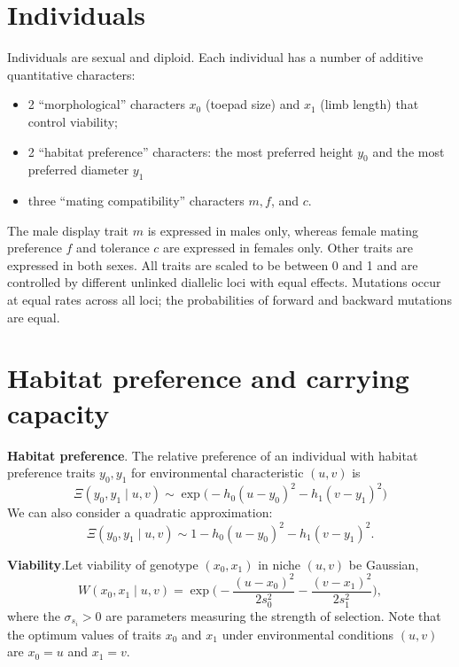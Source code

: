 \documentclass{article}
\begin{document}
\section{Individuals}

Individuals are sexual and diploid. Each individual has a number of additive quantitative characters:
\begin{itemize}
  \item 2 ``morphological'' characters $x_0$ (toepad size) and $x_1$
    (limb length) that control viability;
  \item 2 ``habitat preference'' characters: the most preferred height
    $y_0$ and the most preferred diameter $y_1$
  \item three ``mating compatibility'' characters $m, f$, and $c$.
\end{itemize}

The male display trait $m$ is expressed in males only, whereas female mating preference $f$ and tolerance $c$ are expressed in females only.
Other traits are expressed in both sexes.
All traits are scaled to be between 0 and 1 and are controlled by different unlinked diallelic loci with equal effects.
Mutations occur at equal rates across all loci;
the probabilities of forward and backward mutations are equal.


\newpage
\section{Habitat preference and carrying capacity}

{\bf Habitat preference}.\quad
The relative preference of an individual with habitat preference traits $y_0,y_1$ for environmental characteristic $(u,v)$ is
\begin{equation}
  \Xi(y_0,y_1\mid u,v) \sim \exp\big(-h_0(u-y_0)^2-h_1(v-y_1)^2\big)
\end{equation}
We can also consider a quadratic approximation:
\begin{equation} \label{quad}
  \Xi(y_0,y_1\mid u,v) \sim 1-h_0(u-y_0)^2-h_1(v-y_1)^2.
\end{equation}

{\bf Viability}.\quad Let viability of genotype $(x_0,x_1)$ in niche $(u,v)$ be Gaussian,
\begin{equation}
  W(x_0,x_1 \mid u,v) = \exp\big(-\frac{(u-x_0)^2}{2s_0^2} -\frac{(v-x_1)^2}{2s_1^2}\big),
\end{equation}
where the $\sigma_{s_i}>0$ are parameters measuring the strength of selection.
Note that the optimum values of traits $x_0$ and $x_1$ under environmental conditions $(u,v)$ are $x_0 = u$ and $x_1 = v$.\\
\end{document}

